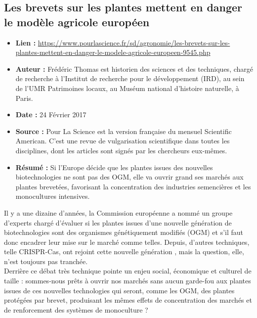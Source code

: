 \documentclass[8pt]{article}
\begin{document}
\begin{itemize}
\end{itemize}

\newpage
\subsection{Les brevets sur les plantes mettent en danger le modèle agricole européen }
\label{sec:brevets}

\begin{itemize}
	\item \textbf{Lien : }  \url{https://www.pourlascience.fr/sd/agronomie/les-brevets-sur-les-plantes-mettent-en-danger-le-modele-agricole-europeen-9545.php} 
	\item \textbf{Auteur : } Frédéric Thomas est historien des sciences
	et des techniques, chargé de recherche à l’Institut de recherche pour le développement (IRD), au sein de l’UMR Patrimoines locaux, au	Muséum national d’histoire naturelle, à Paris.
	
	\item \textbf{Date : }  24 Février 2017
	\item \textbf{Source : } Pour La Science est la version française du mensuel Scientific American. C'est une revue de vulgarisation scientifique dans toutes les disciplines, dont les articles sont signés par les chercheurs eux-mêmes.
	\item \textbf{Résumé : }
	Si l’Europe décide que les plantes issues des nouvelles biotechnologies ne sont pas des OGM,
	elle va ouvrir grand ses marchés aux plantes brevetées, favorisant la concentration
	des industries semencières et les monocultures intensives.
\end{itemize}

Il y a une dizaine d'années, la Commission européenne a nommé un groupe d'experts chargé d'évaluer si les plantes issues d'une nouvelle génération de biotechnologies sont des organismes génétiquement modifiés (OGM) et s'il faut donc encadrer leur mise sur le marché comme telles. Depuis, d'autres techniques, telle CRISPR-Cas, ont rejoint cette nouvelle génération , mais la question, elle, n'est toujours pas tranchée.\\

Derrière ce débat très technique pointe un enjeu social, économique et culturel de taille : sommes-nous prêts à ouvrir nos marchés sans aucun garde-fou aux plantes issues de ces nouvelles technologies qui seront, comme les OGM, des plantes protégées par brevet, produisant les mêmes effets de concentration des marchés et de renforcement des systèmes de monoculture ?\\
\end{document}
